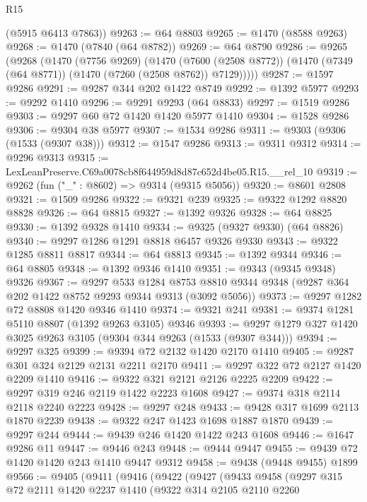 \begin{lexlean}{R15}
\begin{coremodule}
      (@5915 @6413 @7863))
@9263 := @64 @8803
@9265 := @1470 (@8588 @9263)
@9268 := @1470 (@7840 (@64 @8782))
@9269 := @64 @8790
@9286 := @9265
    (@9268
      (@1470
        (@7756 @9269)
        (@1470
          (@7600 (@2508 @8772))
          (@1470 (@7349 (@64 @8771)) (@1470 (@7260 (@2508 @8762)) @7129)))))
@9287 := @1597 @9286
@9291 := @9287 @344 @202 @1422 @8749
@9292 := @1392 @5977
@9293 := @9292 @1410
@9296 := @9291 @9293 (@64 @8833)
@9297 := @1519 @9286
@9303 := @9297 @60 @72 @1420 @1420 @5977 @1410
@9304 := @1528 @9286
@9306 := @9304 @38 @5977
@9307 := @1534 @9286
@9311 := @9303 (@9306 (@1533 (@9307 @38)))
@9312 := @1547 @9286
@9313 := @9311 @9312
@9314 := @9296 @9313
@9315 := LexLeanPreserve.C69a0078cb8f644959d8d87c652d4be05.R15.__rel_10
@9319 := @9262 (fun ("_" : @8602) => @9314 (@9315 @5056))
@9320 := @8601 @2808
@9321 := @1509 @9286
@9322 := @9321 @239
@9325 := @9322 @1292 @8820 @8828
@9326 := @64 @8815
@9327 := @1392 @9326
@9328 := @64 @8825
@9330 := @1392 @9328 @1410
@9334 := @9325 (@9327 @9330) (@64 @8826)
@9340 := @9297 @1286 @1291 @8818 @6457 @9326 @9330
@9343 := @9322 @1285 @8811 @8817
@9344 := @64 @8813
@9345 := @1392 @9344
@9346 := @64 @8805
@9348 := @1392 @9346 @1410
@9351 := @9343 (@9345 @9348) @9326
@9367 := @9297
    @533
    @1284
    @8753
    @8810
    @9344
    @9348
    (@9287 @364 @202 @1422 @8752 @9293 @9344 @9313 (@3092 @5056))
@9373 := @9297 @1282 @72 @8808 @1420 @9346 @1410
@9374 := @9321 @241
@9381 := @9374 @1281 @5110 @8807 (@1392 @9263 @3105) @9346
@9393 := @9297 @1279 @327 @1420 @3025 @9263 @3105 (@9304 @344 @9263 (@1533 (@9307 @344)))
@9394 := @9297 @325
@9399 := @9394 @72 @2132 @1420 @2170 @1410
@9405 := @9287 @301 @324 @2129 @2131 @2211 @2170
@9411 := @9297 @322 @72 @2127 @1420 @2209 @1410
@9416 := @9322 @321 @2121 @2126 @2225 @2209
@9422 := @9297 @319 @246 @2119 @1422 @2223 @1608
@9427 := @9374 @318 @2114 @2118 @2240 @2223
@9428 := @9297 @248
@9433 := @9428 @317 @1699 @2113 @1870 @2239
@9438 := @9322 @247 @1423 @1698 @1887 @1870
@9439 := @9297 @244
@9444 := @9439 @246 @1420 @1422 @243 @1608
@9446 := @1647 @9286 @11
@9447 := @9446 @243
@9448 := @9444 @9447
@9455 := @9439 @72 @1420 @1420 @243 @1410 @9447 @9312
@9458 := @9438 (@9448 @9455) @1899
@9566 := @9405
    (@9411
      (@9416
        (@9422
          (@9427
            (@9433
              @9458
              (@9297
                @315
                @72
                @2111
                @1420
                @2237
                @1410
                (@9322
                  @314
                  @2105
                  @2110
                  @2260

\end{coremodule}
\end{lexlean}
